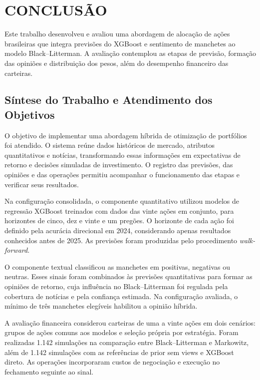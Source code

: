\chapter{CONCLUSÃO}
\label{cap:conclusao}

Este trabalho desenvolveu e avaliou uma abordagem de alocação
de ações brasileiras que integra previsões do XGBoost e
sentimento de manchetes ao modelo Black--Litterman.
A avaliação contemplou as etapas de previsão, formação
das opiniões e distribuição dos pesos, além do desempenho
financeiro das carteiras.

\section{Síntese do Trabalho e Atendimento dos Objetivos}
\label{sec:conclusao_sintese}

O objetivo de implementar uma abordagem híbrida de otimização
de portfólios foi atendido. O sistema reúne dados históricos
de mercado, atributos quantitativos e notícias, transformando
essas informações em expectativas de retorno e decisões
simuladas de investimento. O registro das previsões, das
opiniões e das operações permitiu acompanhar o funcionamento
das etapas e verificar seus resultados.

Na configuração consolidada, o componente quantitativo
utilizou modelos de regressão XGBoost treinados com dados
das vinte ações em conjunto, para horizontes de cinco,
dez e vinte e um pregões. O horizonte de cada ação foi
definido pela acurácia direcional em 2024, considerando
apenas resultados conhecidos antes de 2025. As previsões
foram produzidas pelo procedimento \emph{walk-forward}.

O componente textual classificou as manchetes em positivas,
negativas ou neutras. Esses sinais foram combinados às
previsões quantitativas para formar as opiniões de retorno,
cuja influência no Black--Litterman foi regulada pela
cobertura de notícias e pela confiança estimada. Na
configuração avaliada, o mínimo de três manchetes elegíveis
habilitou a opinião híbrida.

A avaliação financeira considerou carteiras de uma a vinte
ações em dois cenários: grupos de ações comuns aos modelos
e seleção própria por estratégia. Foram realizadas 1.142
simulações na comparação entre Black--Litterman e Markowitz,
além de 1.142 simulações com as referências de prior sem
views e XGBoost direto. As operações incorporaram custos
de negociação e execução no fechamento seguinte ao sinal.

